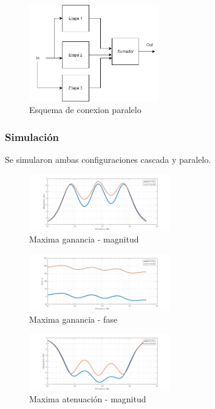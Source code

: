 \documentclass[../../tc_tp3_main.tex]{subfiles}
\begin{document}
\begin{figure}[H]
\centering
\includegraphics[width=0.5\textwidth]{imagenes/paralelo.png}
\caption{Esquema de conexion paralelo} 
\end{figure}


\subsubsection{Simulación}
Se simularon ambas configuraciones cascada y paralelo.

\begin{figure}[H]
\centering
\includegraphics[width=0.55\textwidth]{imagenes/parCasSimMax_m.png}
\caption{Maxima ganancia - magnitud} 
\end{figure}

\begin{figure}[H]
\centering
\includegraphics[width=0.55\textwidth]{imagenes/parCasSimMax_f.png}
\caption{Maxima ganancia - fase} 
\end{figure}

\begin{figure}[H]
\centering
\includegraphics[width=0.55\textwidth]{imagenes/parCasSimMin_m.png}
\caption{Maxima atenuación - magnitud} 
\end{figure}
\end{document}
